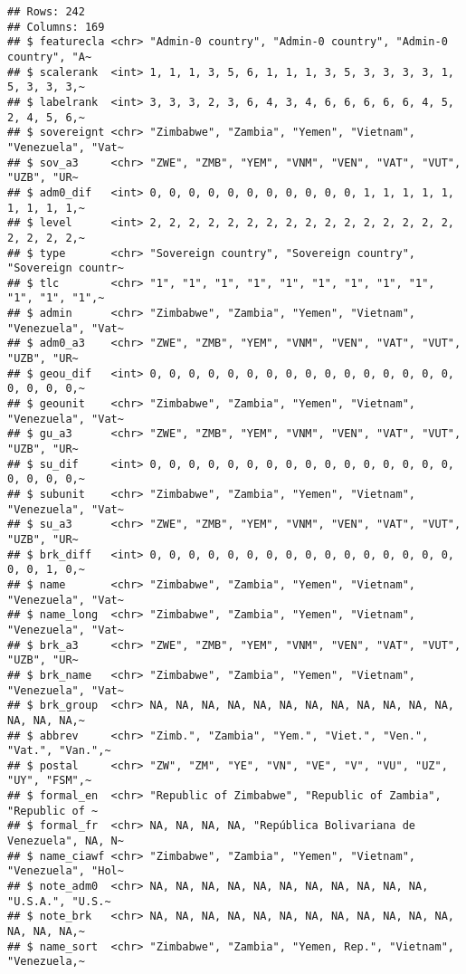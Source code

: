 \documentclass[
]{article}
\begin{document}
\begin{verbatim}
## Rows: 242
## Columns: 169
## $ featurecla <chr> "Admin-0 country", "Admin-0 country", "Admin-0 country", "A~
## $ scalerank  <int> 1, 1, 1, 3, 5, 6, 1, 1, 1, 3, 5, 3, 3, 3, 3, 1, 5, 3, 3, 3,~
## $ labelrank  <int> 3, 3, 3, 2, 3, 6, 4, 3, 4, 6, 6, 6, 6, 6, 4, 5, 2, 4, 5, 6,~
## $ sovereignt <chr> "Zimbabwe", "Zambia", "Yemen", "Vietnam", "Venezuela", "Vat~
## $ sov_a3     <chr> "ZWE", "ZMB", "YEM", "VNM", "VEN", "VAT", "VUT", "UZB", "UR~
## $ adm0_dif   <int> 0, 0, 0, 0, 0, 0, 0, 0, 0, 0, 0, 1, 1, 1, 1, 1, 1, 1, 1, 1,~
## $ level      <int> 2, 2, 2, 2, 2, 2, 2, 2, 2, 2, 2, 2, 2, 2, 2, 2, 2, 2, 2, 2,~
## $ type       <chr> "Sovereign country", "Sovereign country", "Sovereign countr~
## $ tlc        <chr> "1", "1", "1", "1", "1", "1", "1", "1", "1", "1", "1", "1",~
## $ admin      <chr> "Zimbabwe", "Zambia", "Yemen", "Vietnam", "Venezuela", "Vat~
## $ adm0_a3    <chr> "ZWE", "ZMB", "YEM", "VNM", "VEN", "VAT", "VUT", "UZB", "UR~
## $ geou_dif   <int> 0, 0, 0, 0, 0, 0, 0, 0, 0, 0, 0, 0, 0, 0, 0, 0, 0, 0, 0, 0,~
## $ geounit    <chr> "Zimbabwe", "Zambia", "Yemen", "Vietnam", "Venezuela", "Vat~
## $ gu_a3      <chr> "ZWE", "ZMB", "YEM", "VNM", "VEN", "VAT", "VUT", "UZB", "UR~
## $ su_dif     <int> 0, 0, 0, 0, 0, 0, 0, 0, 0, 0, 0, 0, 0, 0, 0, 0, 0, 0, 0, 0,~
## $ subunit    <chr> "Zimbabwe", "Zambia", "Yemen", "Vietnam", "Venezuela", "Vat~
## $ su_a3      <chr> "ZWE", "ZMB", "YEM", "VNM", "VEN", "VAT", "VUT", "UZB", "UR~
## $ brk_diff   <int> 0, 0, 0, 0, 0, 0, 0, 0, 0, 0, 0, 0, 0, 0, 0, 0, 0, 0, 1, 0,~
## $ name       <chr> "Zimbabwe", "Zambia", "Yemen", "Vietnam", "Venezuela", "Vat~
## $ name_long  <chr> "Zimbabwe", "Zambia", "Yemen", "Vietnam", "Venezuela", "Vat~
## $ brk_a3     <chr> "ZWE", "ZMB", "YEM", "VNM", "VEN", "VAT", "VUT", "UZB", "UR~
## $ brk_name   <chr> "Zimbabwe", "Zambia", "Yemen", "Vietnam", "Venezuela", "Vat~
## $ brk_group  <chr> NA, NA, NA, NA, NA, NA, NA, NA, NA, NA, NA, NA, NA, NA, NA,~
## $ abbrev     <chr> "Zimb.", "Zambia", "Yem.", "Viet.", "Ven.", "Vat.", "Van.",~
## $ postal     <chr> "ZW", "ZM", "YE", "VN", "VE", "V", "VU", "UZ", "UY", "FSM",~
## $ formal_en  <chr> "Republic of Zimbabwe", "Republic of Zambia", "Republic of ~
## $ formal_fr  <chr> NA, NA, NA, NA, "República Bolivariana de Venezuela", NA, N~
## $ name_ciawf <chr> "Zimbabwe", "Zambia", "Yemen", "Vietnam", "Venezuela", "Hol~
## $ note_adm0  <chr> NA, NA, NA, NA, NA, NA, NA, NA, NA, NA, NA, "U.S.A.", "U.S.~
## $ note_brk   <chr> NA, NA, NA, NA, NA, NA, NA, NA, NA, NA, NA, NA, NA, NA, NA,~
## $ name_sort  <chr> "Zimbabwe", "Zambia", "Yemen, Rep.", "Vietnam", "Venezuela,~

\end{verbatim}
\end{document}
